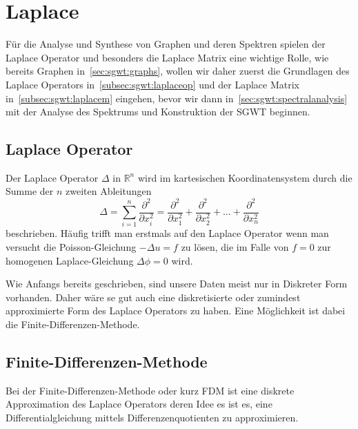 
\section{Laplace\label{sec:sgwt:laplace}}

F\"ur die Analyse und Synthese von Graphen und deren Spektren spielen der 
Laplace Operator und besonders die Laplace Matrix eine wichtige Rolle, wie 
bereits Graphen in~\cref{sec:sgwt:graphs}, wollen wir daher zuerst 
die Grundlagen des Laplace Operators in~\cref{subsec:sgwt:laplaceop} und der 
Laplace Matrix \laplaceL{} in~\cref{subsec:sgwt:laplacem} eingehen, bevor wir 
dann in~\cref{sec:sgwt:spectralanalysis} mit der Analyse des Spektrums und 
Konstruktion der SGWT beginnen.

\subsection{Laplace Operator\label{subsec:sgwt:laplaceop}}

Der Laplace Operator $\Delta$ in $\mathbb{R}^n$ wird im kartesischen 
Koordinatensystem durch die Summe der $n$ zweiten Ableitungen
\begin{equation*}
\Delta = 
\sum_{i = 1}^{n}\frac{\partial^2}{\partial x_i^2}
=
\frac{\partial^2}{\partial x_1^2}
+ \frac{\partial^2}{\partial x_2^2}
+ \dots
+ \frac{\partial^2}{\partial x_n^2}
\end{equation*}
beschrieben. H\"aufig trifft man erstmals auf den Laplace Operator wenn man 
versucht die Poisson-Gleichung $-\Delta u = f$ zu l\"osen, die im Falle von $f 
= 0$ zur homogenen Laplace-Gleichung $\Delta \phi = 0$ wird.

Wie Anfangs bereits geschrieben, sind unsere Daten meist nur in Diskreter Form 
vorhanden. Daher w\"are se gut auch eine diskretisierte oder zumindest 
approximierte Form des Laplace Operators zu haben. Eine M\"oglichkeit ist dabei 
die Finite-Differenzen-Methode.

\subsection{Finite-Differenzen-Methode}

Bei der Finite-Differenzen-Methode oder kurz FDM ist eine diskrete 
Approximation des Laplace Operators deren Idee es ist es, eine 
Differentialgleichung mittels Differenzenquotienten zu approximieren.

